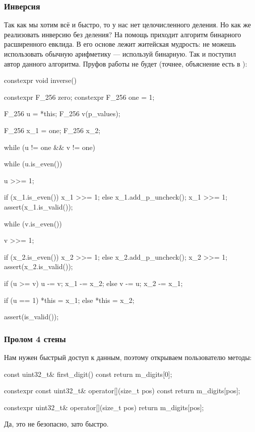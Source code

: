 \subsubsection{Инверсия}
Так как мы хотим всё и быстро, то у нас нет целочисленного деления. Но как же реализовать инверсию без деления? На помощь приходит алгоритм бинарного расширенного евклида. В его основе лежит житейская мудрость: не можешь использовать обычную арифметику --- используй бинарную. Так и поступил автор данного алгоритма. Пруфов работы не будет (точнее, объяснение есть в \cite{das2004guide}):
\begin{cppcode}
constexpr void inverse() {
    constexpr F_256 zero;
    constexpr F_256 one = 1;

    F_256 u = *this;
    F_256 v(p_values);

    F_256 x_1 = one;
    F_256 x_2;

    while (u != one && v != one) {
        while (u.is_even()) {
            u >>= 1;

            if (x_1.is_even()) {
                x_1 >>= 1;
            } else {
                x_1.add_p_uncheck();
                x_1 >>= 1;
                assert(x_1.is_valid());
            }
        }

        while (v.is_even()) {
            v >>= 1;

            if (x_2.is_even()) {
                x_2 >>= 1;
            } else {
                x_2.add_p_uncheck();
                x_2 >>= 1;
                assert(x_2.is_valid());
            }
        }

        if (u >= v) {
            u -= v;
            x_1 -= x_2;
        } else {
            v -= u;
            x_2 -= x_1;
        }
    }

    if (u == 1) {
        *this = x_1;
    } else {
        *this = x_2;
    }

    assert(is_valid());
}
\end{cppcode}
\subsubsection{Пролом 4 стены}
Нам нужен быстрый доступ к данным, поэтому открываем пользователю методы:
\begin{cppcode}
const uint32_t& first_digit() const {
    return m_digits[0];
}

constexpr const uint32_t& operator[](size_t pos) const {
    return m_digits[pos];
}

constexpr uint32_t& operator[](size_t pos) {
    return m_digits[pos];
}
\end{cppcode}
Да, это не безопасно, зато быстро.
